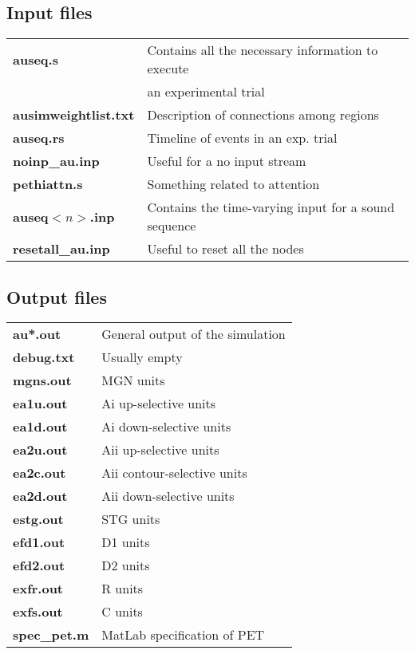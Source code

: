 \documentclass[12pt]{article}
\begin{document}
\subsection{Input files}
\begin{tabular}{ll}
  {\bf auseq.s}             & Contains all the necessary information to 
                              execute \\
  { }                       & an experimental trial \\
  {\bf ausimweightlist.txt} & Description of connections among regions \\ 
  {\bf auseq.rs}            & Timeline of events in an exp. trial \\

  {\bf noinp\_au.inp}       & Useful for a no input stream \\
  {\bf pethiattn.s}         & Something related to attention \\
  {\bf auseq$<n>$.inp}      & Contains the time-varying input for
                              a sound sequence \\  
  {\bf resetall\_au.inp}    & Useful to reset all the nodes
\end{tabular}

\subsection{Output files}
\begin{tabular}{ll}
  {\bf au*.out}    &  General output of the simulation \\
  {\bf debug.txt}  &  Usually empty                    \\
  {\bf mgns.out}   &  MGN units                        \\
  {\bf ea1u.out}   &  Ai up-selective units            \\
  {\bf ea1d.out}   &  Ai down-selective units          \\
  {\bf ea2u.out}   &  Aii up-selective units           \\
  {\bf ea2c.out}   &  Aii contour-selective units      \\
  {\bf ea2d.out}   &  Aii down-selective units         \\
  {\bf estg.out}   &  STG units                        \\
  {\bf efd1.out}   &  D1 units                         \\
  {\bf efd2.out}   &  D2 units                         \\
  {\bf exfr.out}   &  R units                          \\
  {\bf exfs.out}   &  C units                          \\
  {\bf spec\_pet.m} &  MatLab specification of PET      
\end{tabular}
\end{document}
